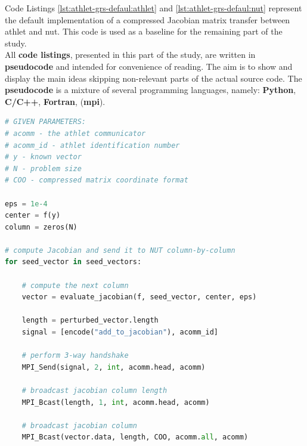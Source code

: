 Code Listings \ref{lst:athlet-grs-defaul:athlet} and \ref{lst:athlet-grs-defaul:nut} represent the default implementation of a compressed Jacobian matrix transfer between \acrshort{athlet} and \acrshort{nut}. This code is used as a baseline for the remaining part of the study.\\


All \textbf{code listings}, presented in this part of the study, are written in \textbf{pseudocode} and intended for convenience of reading. The aim is to show and display the main ideas skipping non-relevant parts of the actual source code. The \textbf{pseudocode} is a mixture of several programming languages, namely: \textbf{Python}, \textbf{C/C++}, \textbf{Fortran}, (\textbf{\acrshort{mpi}}).\\


\begin{minipage}{\linewidth}
\begin{lstlisting}[language=python, caption={Pseudocode of the original \acrshort{athlet}-\acrshort{nut} coupling: \acrshort{athlet} part}, frame=single, label={lst:athlet-grs-defaul:athlet}]
# GIVEN PARAMETERS:
# acomm - the athlet communicator
# acomm_id - athlet identification number 
# y - known vector
# N - problem size
# COO - compressed matrix coordinate format

eps = 1e-4
center = f(y)
column = zeros(N)

# compute Jacobian and send it to NUT column-by-column
for seed_vector in seed_vectors:

	# compute the next column
	vector = evaluate_jacobian(f, seed_vector, center, eps)
	
	length = perturbed_vector.length
	signal = [encode("add_to_jacobian"), acomm_id]
	
	# perform 3-way handshake
	MPI_Send(signal, 2, int, acomm.head, acomm)
	
	# broadcast jacobian column length
	MPI_Bcast(length, 1, int, acomm.head, acomm)
	
	# broadcast jacobian column
	MPI_Bcast(vector.data, length, COO, acomm.all, acomm)
	

\end{lstlisting}
\end{minipage}




